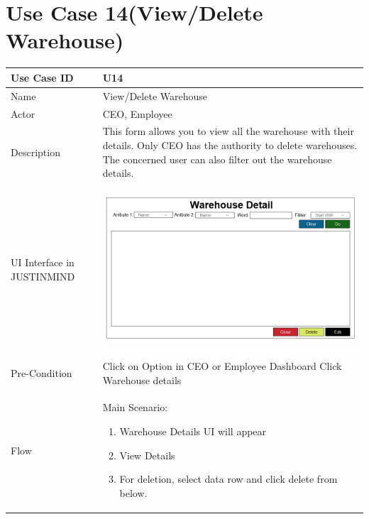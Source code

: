 \documentclass[12pt,a4paper]{report}
\begin{document}
\section{Use Case 14(View/Delete Warehouse)}

\begin{tabular}{ | m{3cm} | m{12cm}| } \hline

Use Case ID &  U14 \\\hline

Name  	    &  View/Delete Warehouse \\ \hline

Actor     	&  CEO, Employee\\ \hline

Description &  This form allows you to view all the warehouse with their details. Only CEO has the authority to delete warehouses. The concerned user can also filter out the warehouse details. \\ \hline

UI Interface in JUSTINMIND & \begin{center} \includegraphics[scale=0.3]{./UIs for Latex Reports/UI-016 ViewAndDelete Warehouse@1x.png}\end{center}  \\ \hline

Pre-Condition & Click on Option in CEO or Employee Dashboard Click Warehouse details  \\ \hline


Flow & Main Scenario:

\begin{enumerate}
\item   Warehouse Details UI will appear
\item  View Details
\item  For deletion, select data row and click delete from below.



\end{enumerate}
\end{tabular}
\end{document}
